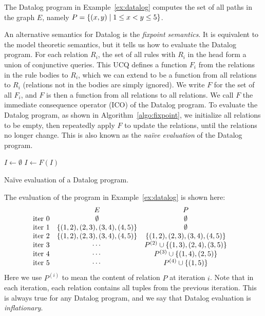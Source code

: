\begin{ex}
\label{ex:tc}
The Datalog program in Example~\ref{ex:datalog}
 computes the set of all paths in the graph $E$, 
 namely $P = \{{(x, y)}\mid{1 \leq x < y \leq 5}\}$. 
\end{ex}

An alternative semantics for Datalog is the {\em fixpoint semantics}.
It is equivalent to the model theoretic semantics,
 but it tells us how to evaluate the Datalog program.
For each relation $R_i$, the set of all rules with $R_i$ in the head 
 form a union of conjunctive queries.
This UCQ defines a function $F_i$ from the relations in the rule bodies to $R_i$,
 which we can extend to be a function from all relations to $R_i$ 
 (relations not in the bodies are simply ignored). 
We write $F$ for the set of all $F_i$, 
 and $F$ is then a function from all relations to all relations.
We call $F$ the immediate consequence operator (ICO) of the Datalog program.
To evaluate the Datalog program, as shown in Algorithm~\ref{algo:fixpoint},
 we initialize all relations to be empty,
 then repeatedly apply $F$ to update the relations, 
 until the relations no longer change.
This is also known as the {\em na\"ive evaluation} of the Datalog program.
\begin{algorithm}
$I \gets \emptyset$\;
{
    $I \gets F(I)$\;
}
\caption{Na\"ive evaluation of a Datalog program.}
\label{algo:fixpoint}
\end{algorithm}

\begin{ex}
\label{ex:tc-fixpoint}
The evaluation of the program in Example~\ref{ex:datalog} is shown here:
%
\begin{align*}
    &
    \begin{array}{l c c } 
                       & E & P \\ 
        \text{iter } 0 & \emptyset & \emptyset \\ 
        \text{iter } 1 & \{(1, 2), (2, 3), (3, 4), (4, 5)\} & \emptyset \\ 
        \text{iter } 2 & \{(1, 2), (2, 3), (3, 4), (4, 5)\} & \{(1, 2), (2, 3), (3, 4), (4, 5)\} \\ 
        \text{iter } 3 & \cdots & P^{(2)} \cup \{ (1, 3), (2, 4), (3, 5)\} \\
        \text{iter } 4 & \cdots & P^{(3)} \cup \{ (1, 4), (2, 5) \} \\
        \text{iter } 5 & \cdots & P^{(4)} \cup \{ (1, 5) \} \\
    \end{array}
\end{align*}
%
Here we use $P^{(i)}$ to mean the content of relation $P$ at iteration $i$.
Note that in each iteration, each relation contains all tuples from the previous iteration.
This is always true for any Datalog program, 
 and we say that Datalog evaluation is {\em inflationary}.
\end{ex}


